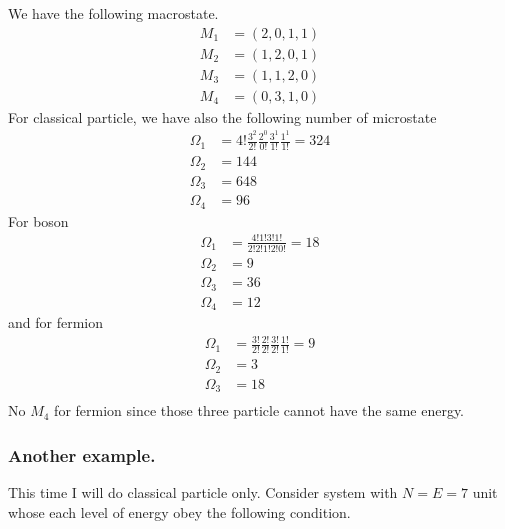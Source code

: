 \documentclass[../../../Main.tex]{subfiles}
\begin{document}
We have the following macrostate.
\begin{align*}
    M_1&=(2,0,1,1)\\
    M_2&=(1,2,0,1)\\
    M_3&=(1,1,2,0)\\
    M_4&=(0,3,1,0)
\end{align*}
For classical particle, we have also the following number of microstate
\begin{align*}
    \Omega_1&=4!\frac{3^2}{2!}\frac{2^0}{0!}\frac{3^1}{1!}\frac{1^1}{1!}=324\\
    \Omega_2&=144\\
    \Omega_3&=648\\
    \Omega_4&=96
\end{align*}
For boson 
\begin{align*}
    \Omega_1&=\frac{4!1!3!1!}{2!2!1!2!0!}=18\\
    \Omega_2&=9\\
    \Omega_3&=36\\
    \Omega_4&=12
\end{align*}
and for fermion
\begin{align*}
    \Omega_1&=\frac{3!}{2!}\frac{2!}{2!}\frac{3!}{2!}\frac{1!}{1!}=9\\
    \Omega_2&=3\\
    \Omega_3&=18\\
\end{align*}
No $M_4$ for fermion since those three particle cannot have the same energy. 

\subsubsection*{Another example.} This time I will do classical particle only. Consider system with $N=E=7$ unit whose each level of energy obey the following condition.
\end{document}
